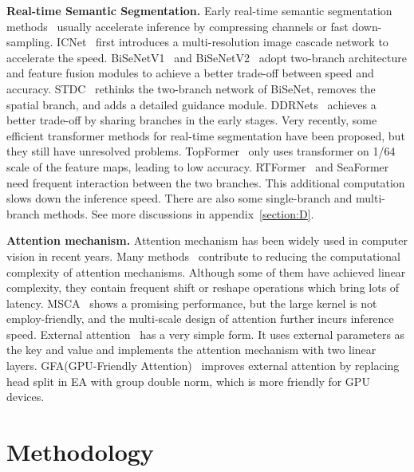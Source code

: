 \documentclass[letterpaper]{article} %
\begin{document}
\noindent
\textbf{Real-time Semantic Segmentation.}
Early real-time semantic segmentation methods~\cite{paszke2016enet,wu2017real} usually accelerate inference by compressing channels or fast down-sampling. ICNet~\cite{zhao2018icnet} first introduces a multi-resolution image cascade network to accelerate the speed. BiSeNetV1~\cite{yu2018bisenet} and BiSeNetV2~\cite{yu2021bisenet} adopt two-branch architecture and feature fusion modules to achieve a better trade-off between speed and accuracy. STDC~\cite{fan2021rethinking} rethinks the two-branch network of BiSeNet, removes the spatial branch, and adds a detailed guidance module. DDRNets~\cite{pan2022deep} achieves a better trade-off by sharing branches in the early stages. Very recently, some efficient transformer methods for real-time segmentation have been proposed, but they still have unresolved problems. TopFormer~\cite{zhang2022topformer} only uses transformer on 1/64 scale of the feature maps, leading to low accuracy. RTFormer~\cite{wang2022rtformer} and SeaFormer~\cite{wan2023seaformer} need frequent interaction between the two branches. This additional computation slows down the inference speed. There are also some single-branch and multi-branch methods. See more discussions in appendix~\ref{section:D}.

\noindent
\textbf{Attention mechanism.}
Attention mechanism has been widely used in computer vision in recent years. Many methods~\cite{chu2021twins,liu2021swin,fang2022msg} contribute to reducing the computational complexity of attention mechanisms. Although some of them have achieved linear complexity, they contain frequent shift or reshape operations which bring lots of latency. MSCA~\cite{guo2022segnext} shows a promising performance, but the large kernel is not employ-friendly, and the multi-scale design of attention further incurs inference speed. External attention~\cite{guo2022beyond} has a very simple form. It uses external parameters as the key and value and implements the attention mechanism with two linear layers. GFA(GPU-Friendly Attention)~\cite{wang2022rtformer} improves external attention by replacing head split in EA with group double norm, which is more friendly for GPU devices.



\section{Methodology}
\end{document}
